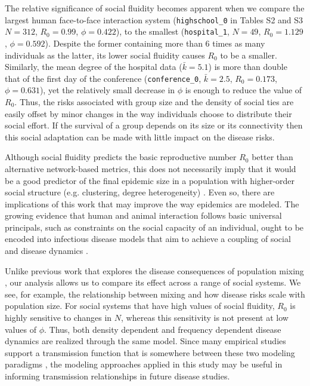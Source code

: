 \documentclass[twocolumn,8pt]{article}
\begin{document}
The relative significance of social fluidity becomes apparent when we compare the largest human face-to-face interaction system (\verb|highschool_0| in Tables S2 and S3 $N=312$, $R_{0}=0.99$, $\phi=0.422$), to the smallest (\verb|hospital_1|, $N=49$, $R_{0}=1.129$, $\phi=0.592$). Despite the former containing more than $6$ times as many individuals as the latter, its lower social fluidity causes $R_{0}$ to be a smaller. Similarly, the mean degree of the hospital data ($\bar{k}=5.1$) is more than double that of the first day of the conference (\verb|conference_0|, $\bar{k}=2.5$, $R_{0}=0.173$, $\phi=0.631$), yet the relatively small decrease in $\phi$ is enough to reduce the value of $R_{0}$. Thus, the risks associated with group size and the density of social ties are easily offset by minor changes in the way individuals choose to distribute their social effort. If the survival of a group depends on its size or its connectivity then this social adaptation can be made with little impact on the disease risks. 

Although social fluidity predicts the basic reproductive number $R_{0}$ better than alternative network-based metrics, this does not necessarily imply that it would be a good predictor of the final epidemic size in a population with higher-order social structure (e.g. clustering, degree heterogeneity) \cite{Millerrsif.2008.0524}. Even so, there are implications of this work that may improve the way epidemics are modeled. The growing evidence that human and animal interaction follows basic universal principals, such as constraints on the social capacity of an individual, ought to be encoded into infectious disease models that aim to achieve a coupling of social and disease dynamics \cite{bioglio2016recalibrating,masuda2017introduction}.

Unlike previous work that explores the disease consequences of population mixing \cite{Volz2925,Reluga20141901}, our analysis allows us to compare its effect across a range of social systems. We see, for example, the relationship between mixing and how disease risks scale with population size. For social systems that have high values of social fluidity, $R_{0}$ is highly sensitive to changes in $N$, whereas this sensitivity is not present at low values of $\phi$. Thus, both density dependent and frequency dependent disease dynamics are realized through the same model. Since many empirical studies support a transmission function that is somewhere between these two modeling paradigms \cite{Smith12052009,ECY:ECY20139492076,borremans2016nonlinear}, the modeling approaches applied in this study may be useful in informing transmission relationships in future disease studies.
\end{document}
